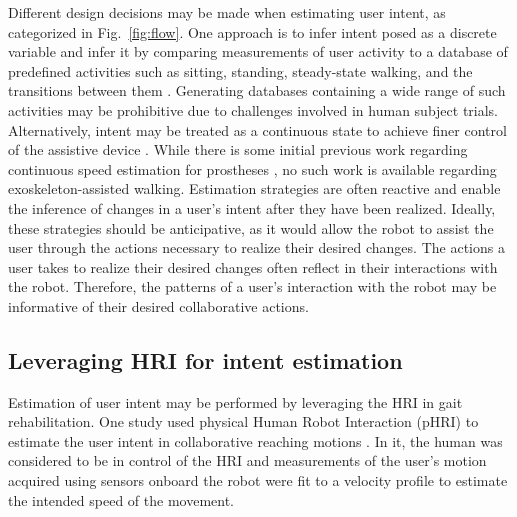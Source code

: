 Different design decisions may be made when estimating user intent, as categorized in Fig.~\ref{fig:flow}. One approach is to infer intent posed as a discrete variable and infer it by comparing measurements of user activity to a database of predefined activities such as sitting, standing, steady-state walking, and the transitions between them \cite{shen2013motion}. Generating databases containing a wide range of such activities may be prohibitive due to challenges involved in human subject trials. Alternatively, intent may be treated as a continuous state to achieve finer control of the assistive device \cite{gambon2019characterizing, suzuki2007intention}. While there is some initial previous work regarding continuous speed estimation for prostheses \cite{best2021phase}, no such work is available regarding exoskeleton-assisted walking. Estimation strategies are often reactive and enable the inference of changes in a user's intent after they have been realized. Ideally, these strategies should be anticipative, as it would allow the robot to assist the user through the actions necessary to realize their desired changes. The actions a user takes to realize their desired changes often reflect in their interactions with the robot. Therefore, the patterns of a user's interaction with the robot may be informative of their desired collaborative actions.

\subsection{Leveraging HRI for intent estimation}\label{sec:HRI}

Estimation of user intent may be performed by leveraging the HRI in gait rehabilitation. One study used physical Human Robot Interaction (pHRI) to estimate the user intent in collaborative reaching motions  \cite{corteville2007human}. In it, the human was considered to be in control of the HRI and measurements of the user's motion acquired using sensors onboard the robot were fit to a velocity profile to estimate the intended speed of the movement. 


